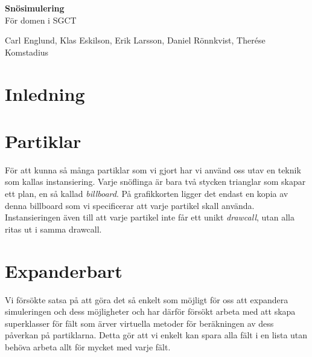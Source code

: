 \documentclass[12pt,a4paper]{article}
\begin{document}
\begin{center}




{ \huge \bfseries Snösimulering \\[0.2cm] }
	För domen i SGCT
	\vskip 0.4cm

\begin{minipage}{0.8\textwidth}
\centering
	Carl Englund,
	Klas Eskilson,
	Erik Larsson,
	Daniel Rönnkvist,
	Therése Komstadius
\end{minipage}

\end{center}
\section*{Inledning}

\section*{Partiklar}
För att kunna så många partiklar som vi gjort har vi använd oss utav en teknik som kallas instansiering.
Varje snöflinga är bara två stycken trianglar som skapar ett plan, en så kallad \emph{billboard}. På grafikkorten ligger det endast en kopia av denna billboard som vi specificerar att varje partikel skall använda. Instansieringen även till att varje partikel inte får ett unikt \emph{drawcall}, utan alla ritas ut i samma drawcall.
\section*{Expanderbart}
Vi försökte satsa på att göra det så enkelt som möjligt för oss att expandera simuleringen och dess möjligheter och har därför försökt arbeta med att skapa superklasser för fält som ärver virtuella metoder för beräkningen av dess påverkan på partiklarna. Detta gör att vi enkelt kan spara alla fält i en lista utan behöva arbeta allt för mycket med varje fält.
\end{document}
